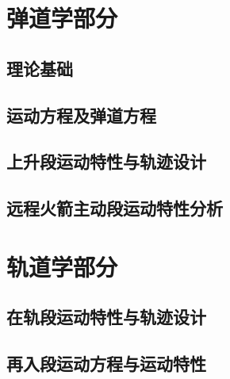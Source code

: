 \documentclass[openany,10pt,UTF8]{ctexbook}
\begin{document}
\frontmatter

\tableofcontents %
\mainmatter
\part{弹道学部分}
\chapter{理论基础}	







\chapter{运动方程及弹道方程}



\chapter{上升段运动特性与轨迹设计}



\chapter{远程火箭主动段运动特性分析}




\part{轨道学部分}
\chapter{在轨段运动特性与轨迹设计}


\chapter{再入段运动方程与运动特性}

\end{document}
